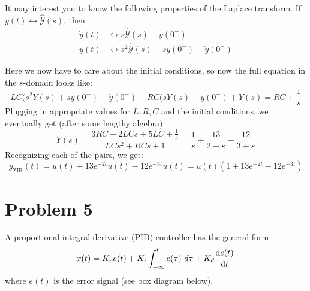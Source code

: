 \documentclass[10pt]{article}
\begin{document}
\begin{enumerate}[label=\alph*)]
			It may interest you to know the following properties of the Laplace transform. If \( y(t) \leftrightarrow 
			\hat{\mathcal Y}(s)\), then 
			\begin{align*}
				\dot y(t) &\leftrightarrow s \hat{\mathcal Y}(s) - y(0^{-})\\
				\ddot y(t) &\leftrightarrow s^2 \hat{\mathcal Y}(s) - sy(0^{-}) - \dot y(0^{-})
			\end{align*}

			\begin{solution}
				Here we now have to care about the initial conditions, so now the full equation 
				in the \( s \)-domain looks like:
				\[
				LC(s^2 Y(s) + s y(0^{-}) - \dot y(0^{-}) + RC(sY(s) - y(0^{-}) + Y(s) = RC + \frac{1}{s}
				\] 
				Plugging in appropriate values for \( L, R, C \) and the initial conditions, we eventually 
				get (after some lengthy algebra): 
				\[
				Y(s) = \frac{3RC + 2LCs + 5LC + \frac{1}{s}}{LCs^2 + RCs + 1} = \frac{1}{s} + \frac{13}{2 + s} - 
				\frac{12}{3 + s}
				\] 
				Recognizing each of the pairs, we get:
				\[
				y_{\text{ZIR}}(t) = u(t) + 13 e^{-2t}u(t) - 12e^{-3t}u(t) = u(t)(1 + 13 e^{-2t} - 12 e^{-3t})
				\] 
			\end{solution}
	\end{enumerate}
	\pagebreak
	\section*{Problem 5}
	A proportional-integral-derivative (PID) controller has the general form
	\[
		x(t) = K_p e(t) + K_i \int_{-\infty}^{t} e(\tau) \ d \tau + K_d \dv{e(t)}{t}
	\] 
	where \( e(t) \) is the error signal (see box diagram below).
\end{document}
